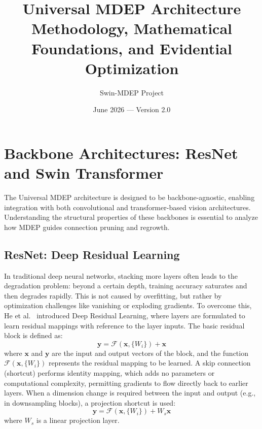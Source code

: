 \documentclass[11pt, a4paper]{article}
\title{
    \textbf{Universal MDEP Architecture} \\[6pt]
    \large Methodology, Mathematical Foundations, and Evidential Optimization
}
\author{Swin-MDEP Project}
\date{June 2026 --- Version 2.0}
\begin{document}
\maketitle

\section{Backbone Architectures: ResNet and Swin Transformer}\label{sec:backbones}

The Universal MDEP architecture is designed to be backbone-agnostic, enabling integration with both convolutional and transformer-based vision architectures. Understanding the structural properties of these backbones is essential to analyze how MDEP guides connection pruning and regrowth.

\subsection{ResNet: Deep Residual Learning}

In traditional deep neural networks, stacking more layers often leads to the degradation problem: beyond a certain depth, training accuracy saturates and then degrades rapidly. This is not caused by overfitting, but rather by optimization challenges like vanishing or exploding gradients. To overcome this, He et al.~\cite{he2016deep} introduced Deep Residual Learning, where layers are formulated to learn residual mappings with reference to the layer inputs. The basic residual block is defined as:
\begin{equation}\label{eq:residual_block}
    \mathbf{y} = \mathcal{F}(\mathbf{x}, \{W_i\}) + \mathbf{x}
\end{equation}
where $\mathbf{x}$ and $\mathbf{y}$ are the input and output vectors of the block, and the function $\mathcal{F}(\mathbf{x}, \{W_i\})$ represents the residual mapping to be learned. A skip connection (shortcut) performs identity mapping, which adds no parameters or computational complexity, permitting gradients to flow directly back to earlier layers. When a dimension change is required between the input and output (e.g., in downsampling blocks), a projection shortcut is used:
\begin{equation}\label{eq:residual_proj}
    \mathbf{y} = \mathcal{F}(\mathbf{x}, \{W_i\}) + W_s \mathbf{x}
\end{equation}
where $W_s$ is a linear projection layer.
\end{document}
